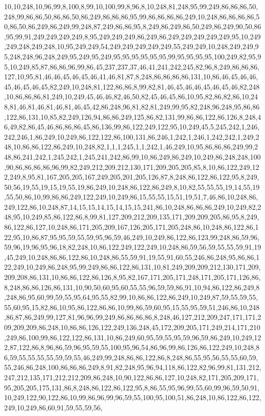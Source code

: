 10,10,248,10,96,99,8,100,8,99,10,100,99,8,96,8,10,248,81,248,95,99,249,86,86,86,50,248,99,86,86,50,86,86,50,86,249,86,86,86,95,99,86,86,86,86,249,10,248,86,86,86,86,50,86,50,86,249,86,249,99,248,87,249,86,86,95,8,249,86,249,86,50,249,86,249,90,50,86,95,99,91,249,249,249,249,8,95,249,249,249,86,249,86,249,249,249,249,249,95,10,249,249,248,249,248,10,95,249,249,54,249,249,249,249,249,55,249,249,10,248,249,249,95,248,248,96,248,249,95,249,95,249,95,95,95,95,95,95,99,95,95,95,95,100,249,82,95,95,10,249,85,87,86,86,96,99,86,45,237,237,37,46,41,241,242,245,82,96,8,249,86,86,86,127,10,95,81,46,46,45,46,45,46,41,46,81,87,8,248,86,86,86,86,131,10,86,46,45,46,46,45,46,45,46,45,82,249,10,248,81,122,86,86,8,99,82,81,46,45,46,46,45,46,45,46,82,248,10,86,86,86,81,249,10,249,45,46,46,82,46,50,82,45,46,45,86,10,95,82,86,82,86,10,248,81,46,81,46,81,46,81,46,45,42,86,248,96,81,82,81,249,99,95,82,248,96,248,95,86,86,122,86,131,10,85,82,249,126,94,86,86,249,125,86,82,131,99,86,86,122,86,126,8,248,46,49,82,86,45,46,86,86,86,45,86,136,99,86,122,249,122,95,10,249,45,5,245,242,1,246,242,246,1,86,249,10,249,86,122,122,86,100,131,86,246,1,242,1,246,1,242,242,1,249,248,10,86,86,122,86,249,10,248,82,1,1,1,245,1,1,242,1,46,249,10,95,86,86,86,249,99,248,86,241,242,1,245,242,1,245,241,242,86,99,10,86,249,86,249,10,249,86,248,248,100,90,86,86,86,86,96,99,82,249,212,209,212,130,171,209,205,205,85,8,10,86,122,249,122,249,8,95,81,167,205,205,167,249,205,201,205,126,87,8,248,86,122,86,122,95,8,249,50,56,19,55,19,15,19,55,19,86,249,10,248,86,122,86,249,8,10,82,55,55,55,19,14,55,19,55,50,86,10,99,86,86,249,122,249,10,249,86,15,55,55,15,51,19,51,7,46,86,10,248,86,249,122,86,10,248,87,14,15,15,14,15,14,15,15,241,86,10,248,86,86,86,249,10,249,82,248,95,10,249,85,86,122,86,8,99,81,127,209,212,209,135,171,209,209,205,86,95,8,249,86,122,86,127,10,248,86,171,205,209,167,126,205,171,205,248,86,10,248,86,122,86,122,95,10,86,87,95,95,59,55,59,95,96,59,46,249,10,249,86,122,86,123,99,248,86,59,96,59,96,19,96,95,96,18,82,248,10,86,122,249,122,249,10,248,86,59,56,59,55,55,59,91,19,45,249,10,248,86,86,122,86,10,248,86,55,59,91,19,55,91,60,55,246,86,248,95,86,86,122,249,10,249,86,248,95,99,249,86,86,122,86,131,10,81,249,209,209,212,130,171,209,209,208,86,131,10,86,86,122,86,126,8,95,82,167,171,205,171,248,171,205,171,126,86,8,248,86,86,126,86,131,10,90,50,60,95,60,55,55,96,59,59,86,91,10,94,86,122,86,249,8,248,86,95,60,99,59,55,95,64,95,55,82,99,10,86,86,122,86,249,10,249,87,59,55,59,55,55,60,95,15,82,86,10,95,86,122,86,86,10,99,86,59,60,95,15,55,95,59,51,246,86,10,248,86,87,86,249,99,127,81,96,96,99,249,86,86,86,86,8,248,46,127,212,209,247,171,171,209,209,209,86,248,10,86,86,126,122,249,136,248,45,172,209,205,171,249,214,171,210,249,86,100,99,86,122,122,86,131,10,86,249,60,95,59,55,95,59,96,59,86,249,10,249,122,87,122,86,8,96,86,59,96,95,59,55,100,95,96,54,86,96,99,86,126,86,122,249,10,248,86,59,55,55,55,55,59,59,55,46,249,99,248,86,86,122,86,8,248,86,55,95,56,55,55,60,59,55,246,86,248,100,86,86,86,249,8,91,82,248,95,96,94,118,86,122,82,96,99,81,131,212,247,212,135,171,212,212,209,86,248,10,90,122,86,86,127,10,248,82,171,205,209,171,95,205,205,175,131,86,8,248,86,122,86,122,95,8,86,55,95,96,99,55,60,99,96,59,50,91,10,249,122,90,122,86,10,99,86,96,99,96,59,55,100,95,100,51,86,248,10,86,122,86,122,249,10,249,86,60,91,59,55,59,56,